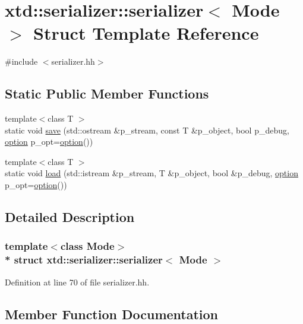 \hypertarget{structxtd_1_1serializer_1_1serializer}{}\section{xtd\+:\+:serializer\+:\+:serializer$<$ Mode $>$ Struct Template Reference}
\label{structxtd_1_1serializer_1_1serializer}


{\ttfamily \#include $<$serializer.\+hh$>$}

\subsection*{Static Public Member Functions}
\begin{DoxyCompactItemize}
\item 
{\footnotesize template$<$class T $>$ }\\static void \hyperlink{structxtd_1_1serializer_1_1serializer_a3e2f6195fd27da1f10e131facc8e017f}{save} (std\+::ostream \&p\+\_\+stream, const T \&p\+\_\+object, bool p\+\_\+debug, \hyperlink{structxtd_1_1serializer_1_1option}{option} p\+\_\+opt=\hyperlink{structxtd_1_1serializer_1_1option}{option}())
\item 
{\footnotesize template$<$class T $>$ }\\static void \hyperlink{structxtd_1_1serializer_1_1serializer_ac8fd960ff27c165ad77f657f685add30}{load} (std\+::istream \&p\+\_\+stream, T \&p\+\_\+object, bool \&p\+\_\+debug, \hyperlink{structxtd_1_1serializer_1_1option}{option} p\+\_\+opt=\hyperlink{structxtd_1_1serializer_1_1option}{option}())
\end{DoxyCompactItemize}


\subsection{Detailed Description}
\subsubsection*{template$<$class Mode$>$\\*
struct xtd\+::serializer\+::serializer$<$ Mode $>$}



Definition at line 70 of file serializer.\+hh.



\subsection{Member Function Documentation}
